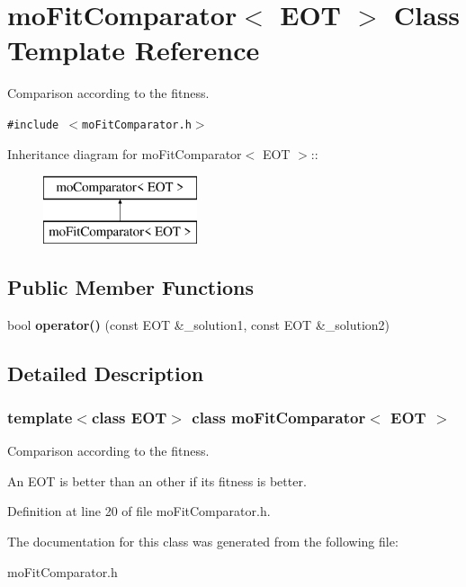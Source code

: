 \section{moFitComparator$<$ EOT $>$ Class Template Reference}
\label{classmo_fit_comparator}
Comparison according to the fitness.  


{\tt \#include $<$moFitComparator.h$>$}

Inheritance diagram for moFitComparator$<$ EOT $>$::\begin{figure}[H]
\begin{center}
\leavevmode
\includegraphics[height=2cm]{classmo_fit_comparator}
\end{center}
\end{figure}
\subsection*{Public Member Functions}
\begin{CompactItemize}
\item 
bool {\bf operator()} (const EOT \&\_\-solution1, const EOT \&\_\-solution2)\label{classmo_fit_comparator_c920d5a49deb16710daf1e5fcde6b16c}

\end{CompactItemize}


\subsection{Detailed Description}
\subsubsection*{template$<$class EOT$>$ class moFitComparator$<$ EOT $>$}

Comparison according to the fitness. 

An EOT is better than an other if its fitness is better. 



Definition at line 20 of file moFitComparator.h.

The documentation for this class was generated from the following file:\begin{CompactItemize}
\item 
moFitComparator.h\end{CompactItemize}
